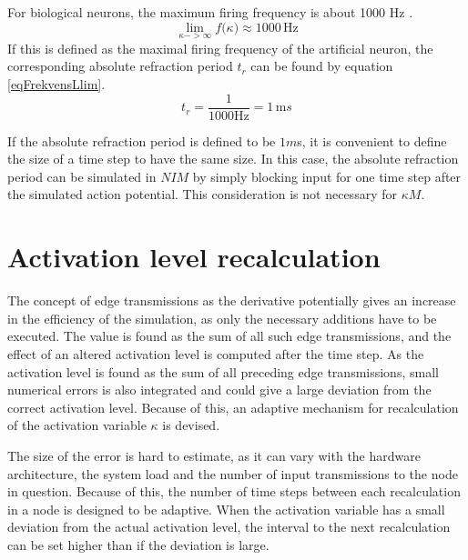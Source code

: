 For biological neurons, the maximum firing frequency is about 1000 Hz \cite{NeuroscienceExploringTheBrain3ed}. %
\begin{equation}
	\lim_{\kappa->\infty}{ f(\kappa}) \approx 1000 \, \text{Hz}
\end{equation}
If this is defined as the maximal firing frequency of the artificial neuron, the corresponding absolute refraction period $t_r$ can be found by equation \ref{eqFrekvensLlim}.
\begin{equation}
	t_r = \frac{1}{1000 \text{Hz}} = 1 \, \text{m}s %
\end{equation}

If the absolute refraction period is defined to be $1$$m$s, it is convenient to define the size of a time step to have the same size.
In this case, the absolute refraction period can be simulated in $NIM$ by simply blocking input for one time step after the simulated action potential.
This consideration is not necessary for $\kappa M$.



\section{Activation level recalculation} 		%
\label{appendixRecalculateKappaClass}
	The concept of edge transmissions as the derivative potentially gives an increase in the efficiency of the simulation, as only the necessary additions have to be executed.
	The value is found as the sum of all such edge transmissions, and the effect of an altered activation level is computed after the time step.
	As the activation level is found as the sum of all preceding edge transmissions, small numerical errors is also integrated and could give a large deviation from the correct activation level.
	Because of this, an adaptive mechanism for recalculation of the activation variable $\kappa$ is devised.

	The size of the error is hard to estimate, as it can vary with the hardware architecture, the system load and the number of input transmissions to the node in question.
	Because of this, the number of time steps between each recalculation in a node is designed to be adaptive.
	When the activation variable has a small deviation from the actual activation level, the interval to the next recalculation can be set higher than if the deviation is large.


